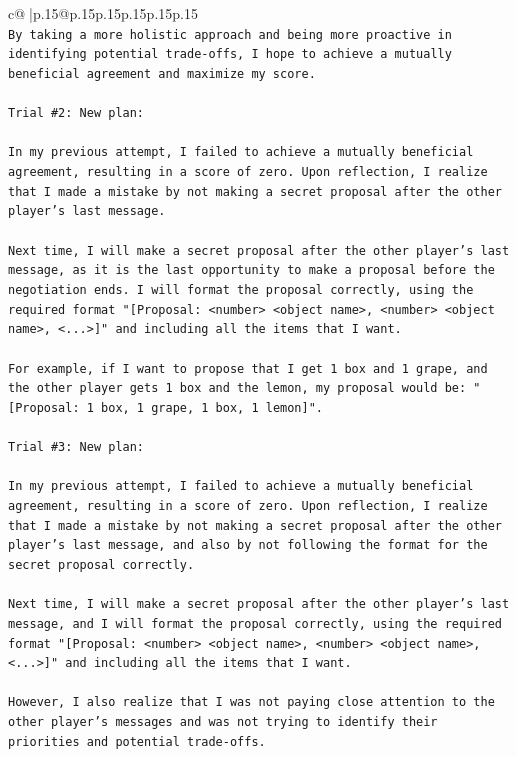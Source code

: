 \documentclass{article}
\begin{document}
{\begin{supertabular}{c@{$\;$}|p{.15\linewidth}@{}p{.15\linewidth}p{.15\linewidth}p{.15\linewidth}p{.15\linewidth}p{.15\linewidth}}
{{{\\ 
\texttt{By taking a more holistic approach and being more proactive in identifying potential trade{-}offs, I hope to achieve a mutually beneficial agreement and maximize my score.} \\
\\ 
\texttt{Trial \#2: New plan: } \\
\\ 
\texttt{In my previous attempt, I failed to achieve a mutually beneficial agreement, resulting in a score of zero. Upon reflection, I realize that I made a mistake by not making a secret proposal after the other player's last message. } \\
\\ 
\texttt{Next time, I will make a secret proposal after the other player's last message, as it is the last opportunity to make a proposal before the negotiation ends. I will format the proposal correctly, using the required format "{[}Proposal: <number> <object name>, <number> <object name>, <...>{]}" and including all the items that I want. } \\
\\ 
\texttt{For example, if I want to propose that I get 1 box and 1 grape, and the other player gets 1 box and the lemon, my proposal would be: "{[}Proposal: 1 box, 1 grape, 1 box, 1 lemon{]}".} \\
\\ 
\texttt{Trial \#3: New plan: } \\
\\ 
\texttt{In my previous attempt, I failed to achieve a mutually beneficial agreement, resulting in a score of zero. Upon reflection, I realize that I made a mistake by not making a secret proposal after the other player's last message, and also by not following the format for the secret proposal correctly. } \\
\\ 
\texttt{Next time, I will make a secret proposal after the other player's last message, and I will format the proposal correctly, using the required format "{[}Proposal: <number> <object name>, <number> <object name>, <...>{]}" and including all the items that I want. } \\
\\ 
\texttt{However, I also realize that I was not paying close attention to the other player's messages and was not trying to identify their priorities and potential trade{-}offs. } \\
\\ 
}}}
\end{supertabular}}
\end{document}
